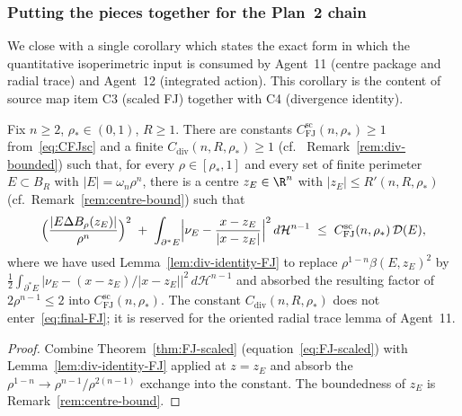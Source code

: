 \subsubsection{Putting the pieces together for the Plan~2 chain}
\label{ssec:assembly}

We close with a single corollary which states the exact form in which
the quantitative isoperimetric input is consumed by Agent~11 (centre
package and radial trace) and Agent~12 (integrated action). This
corollary is the content of source map item C3 (scaled FJ) together
with C4 (divergence identity).

\begin{corollary}\label{cor:strong-osc-scaled}
Fix $n\ge 2$, $\rho_*\in(0,1)$, $R\ge 1$. There are constants
$C_{\mathrm{FJ}}^{\mathrm{sc}}(n,\rho_*)\ge 1$ from~\eqref{eq:CFJsc}
and a finite $C_{\mathrm{div}}(n,R,\rho_*)\ge 1$ (cf.~%
Remark~\ref{rem:div-bounded}) such that, for every $\rho\in[\rho_*,1]$
and every set of finite perimeter $E\subset B_R$ with $|E|=\omega_n\rho^n$,
there is a centre $z_E\in\R^n$ with $|z_E|\le R'(n,R,\rho_*)$
(cf.~Remark~\ref{rem:centre-bound}) such that
\begin{equation}\label{eq:final-FJ}
   \Bigl(\frac{|E\Delta B_\rho(z_E)|}{\rho^n}\Bigr)^2
   \;+\;\int_{\partial^*E}
        \Bigl|\nu_E-\frac{x-z_E}{|x-z_E|}\Bigr|^2\,
        d\mathcal H^{n-1}
   \;\le\;
   C_{\mathrm{FJ}}^{\mathrm{sc}}(n,\rho_*)\,\mathcal D(E),
\end{equation}
where we have used Lemma~\ref{lem:div-identity-FJ} to replace
$\rho^{1-n}\beta(E,z_E)^2$ by
$\frac12\int_{\partial^*E}|\nu_E-(x-z_E)/|x-z_E||^2\,d\mathcal H^{n-1}$
and absorbed the resulting factor of $2\rho^{n-1}\le 2$ into
$C_{\mathrm{FJ}}^{\mathrm{sc}}(n,\rho_*)$. The constant
$C_{\mathrm{div}}(n,R,\rho_*)$ does not enter~\eqref{eq:final-FJ}; it
is reserved for the oriented radial trace lemma of Agent~11.
\end{corollary}

\begin{proof}
Combine Theorem~\ref{thm:FJ-scaled} (equation~\eqref{eq:FJ-scaled}) with
Lemma~\ref{lem:div-identity-FJ} applied at $z=z_E$ and absorb the
$\rho^{1-n}\to\rho^{n-1}/\rho^{2(n-1)}$ exchange into the constant. The
boundedness of $z_E$ is Remark~\ref{rem:centre-bound}.
\end{proof}

